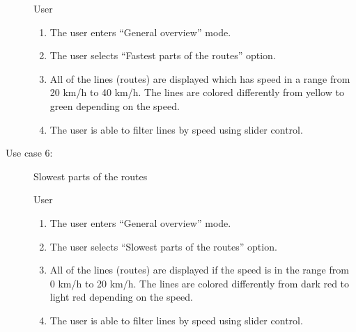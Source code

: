 \begin{description}
  \underline{} User

  \underline{}
  \begin{enumerate}
    \item The user enters ``General overview'' mode.
    \item The user selects ``Fastest parts of the routes'' option.
    \item All of the lines (routes) are displayed which has speed in a range from
    20 km/h to 40 km/h. The lines are colored differently from yellow to green
    depending on the speed.
    \item The user is able to filter lines by speed using slider control.
  \end{enumerate}

  \item[Use case 6:] Slowest parts of the routes

  \underline{} User

  \underline{}
  \begin{enumerate}
    \item The user enters ``General overview'' mode.
    \item The user selects ``Slowest parts of the routes'' option.
    \item All of the lines (routes) are displayed if the speed is in the range from
    0 km/h to 20 km/h. The lines are colored differently from dark red to light red
    depending on the speed.
    \item The user is able to filter lines by speed using slider control.
  \end{enumerate}
\end{description}